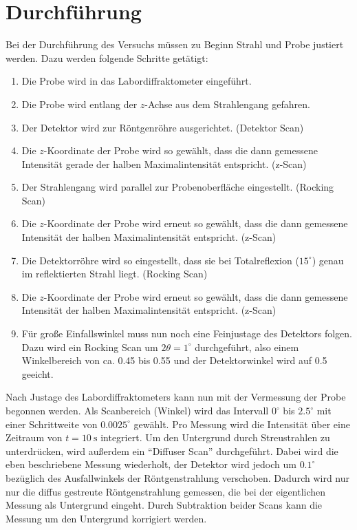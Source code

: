 \section{Durchführung}
Bei der Durchführung des Versuchs müssen zu Beginn Strahl und Probe justiert werden. Dazu werden folgende Schritte getätigt:
\begin{enumerate}
 \item Die Probe wird in das Labordiffraktometer eingeführt.
 \item Die Probe wird entlang der $z$-Achse aus dem Strahlengang gefahren.
 \item Der Detektor wird zur Röntgenröhre ausgerichtet. (Detektor Scan)
 \item Die $z$-Koordinate der Probe wird so gewählt, dass die dann gemessene Intensität gerade der halben Maximalintensität entspricht. (z-Scan)
 \item Der Strahlengang wird parallel zur Probenoberfläche eingestellt. (Rocking Scan)
 \item Die $z$-Koordinate der Probe wird erneut so gewählt, dass die dann gemessene Intensität der halben Maximalintensität entspricht. (z-Scan)
 \item Die Detektorröhre wird so eingestellt, dass sie bei Totalreflexion ($15^\circ$) genau im reflektierten Strahl liegt. (Rocking Scan)
 \item Die $z$-Koordinate der Probe wird erneut so gewählt, dass die dann gemessene Intensität der halben Maximalintensität entspricht. (z-Scan)
 \item Für große Einfallswinkel muss nun noch eine Feinjustage des Detektors folgen. Dazu wird ein Rocking Scan um $2\theta=1^\circ$ durchgeführt, also einem
 Winkelbereich von ca. 0.45 bis 0.55 und der Detektorwinkel wird auf 0.5 geeicht.
\end{enumerate}
Nach Justage des Labordiffraktometers kann nun mit der Vermessung der Probe begonnen werden. Als Scanbereich (Winkel) wird das Intervall $0^\circ$ bis 
$2.5^\circ$ mit einer Schrittweite von $0.0025^\circ$ gewählt. Pro Messung wird die Intensität über eine Zeitraum von $t=\SI{10}{\second}$ integriert. Um den Untergrund durch Streustrahlen zu unterdrücken, wird außerdem ein ``Diffuser Scan'' durchgeführt. Dabei wird die eben beschriebene Messung wiederholt, der Detektor wird jedoch um $0.1^\circ$ bezüglich des Ausfallwinkels der Röntgenstrahlung verschoben. Dadurch wird nur nur die diffus gestreute Röntgenstrahlung gemessen, die bei der eigentlichen Messung als Untergrund eingeht. Durch Subtraktion beider Scans kann die Messung um den Untergrund korrigiert werden.

